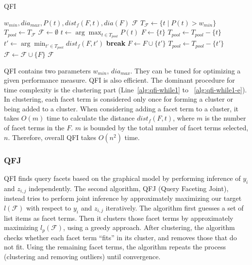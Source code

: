 \begin{algorithm}[!ht]
 \caption{QFI}
\label{alg:qfi}
\begin{algorithmic}[1]
  \Require $w_{min}, dia_{max}, P(t), dist_f(F,t), dia(F)$
  \Ensure $\mathcal{F}$
  \State $T_\mathcal{F} \leftarrow \{t\;|\;P(t)\!>\!w_{min}\}$ \label{alg:qfi-term}
  \State $T_{pool} \leftarrow T_\mathcal{F}$ \label{alg:qfi-pool}
  \State $\mathcal{F} \leftarrow \emptyset$ \label{alg:qfi-fempty}
   \label{alg:qfi-while1}
    \State $t \leftarrow \arg\!\max_{t\in T_{pool}}{P(t)}$ 
    \State $F \leftarrow \{t\}$
    \State $T_{pool}\leftarrow {T_{pool}}\!-\!\{t\}$
      \State $t' \leftarrow \arg\!\min_{t'\in T_{pool}}{dist_f(F,t')}$ \label{alg:qfi-closest}
       \label{alg:qfi-dia}
	\State \textbf{break}
      \EndIf
      \State $F \leftarrow F \cup \{t'\}$
      \State $T_{pool}\leftarrow {T_{pool}}\!-\!\{t'\}$
    \EndWhile
    \State $\mathcal{F} \leftarrow \mathcal{F} \cup \{F\}$ \label{alg:qfi-collect}
  \EndWhile \label{alg:qfi-while1-e}
  \State \Return $\mathcal{F}$ \label{alg:qfi-return}
\end{algorithmic}
\end{algorithm}

QFI contains two parameters $w_{min}$, $dia_{max}$. They can be tuned for optimizing a given performance measure. QFI is also efficient. The dominant procedure for time complexity is the clustering part (Line~\ref{alg:qfi-while1} to ~\ref{alg:qfi-while1-e}). In clustering, each facet term is considered only once for forming a cluster or being added to a cluster. When considering adding a facet term to a cluster, it takes $O(m)$ time to calculate the distance $dist_f(F,t)$, where $m$ is the number of facet terms in the $F$. $m$ is bounded by the total number of facet terms selected, $n$. Therefore, overall QFI takes $O(n^2)$ time.

\subsubsection{QFJ}
QFI finds query facets based on the graphical model by performing inference of $y_i$ and $z_{i,j}$ independently.
The second algorithm, QFJ (Query Faceting Joint), instead tries to perform joint inference by approximately maximizing our target $l(\mathcal{F})$ with respect to  $y_i$ and $z_{i,j}$ iteratively.
The algorithm first guesses a set of list items as facet terms.
Then it clusters those facet terms by approximately maximizing $l_p(\mathcal{F})$, using a greedy approach. 
After clustering, the algorithm checks whether each facet term ``fits'' in its cluster, and removes those that do not fit.
Using the remaining facet terms, the algorithm repeats the process (clustering and removing outliers) until convergence.

